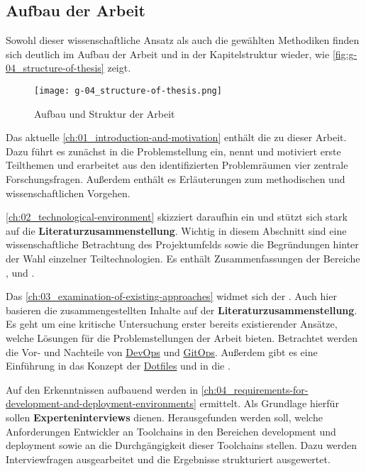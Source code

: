 \subsection{Aufbau der Arbeit}
\label{subsec:01-05-02_structure-of-the-thesis}

Sowohl dieser wissenschaftliche Ansatz als auch die gewählten Methodiken finden sich deutlich im Aufbau der Arbeit und in der Kapitelstruktur wieder, wie \autoref{fig:g-04_structure-of-thesis} zeigt.

\begin{figure}[h]
    \centering
    \texttt{[image: g-04\_structure-of-thesis.png]}
    \caption{Aufbau und Struktur der Arbeit}
    \label{fig:g-04_structure-of-thesis}
\end{figure}

Das aktuelle \autoref{ch:01_introduction-and-motivation} enthält die  zu dieser Arbeit. Dazu führt es zunächst in die Problemstellung ein, nennt und motiviert erste Teilthemen und erarbeitet aus den identifizierten Problemräumen vier zentrale Forschungsfragen. Außerdem enthält es Erläuterungen zum methodischen und wissenschaftlichen Vorgehen.

\pagebreak[4]

\autoref{ch:02_technological-environment} skizziert daraufhin ein  und stützt sich stark auf die \textbf{Literaturzusammenstellung}. Wichtig in diesem Abschnitt sind eine wissenschaftliche Betrachtung des Projektumfelds sowie die Begründungen hinter der Wahl einzelner Teiltechnologien. Es enthält Zusammenfassungen der Bereiche ,  und .

Das \autoref{ch:03_examination-of-existing-approaches} widmet sich der . Auch hier basieren die zusammengestellten Inhalte auf der \textbf{Literaturzusammenstellung}. Es geht um eine kritische Untersuchung erster bereits existierender Ansätze, welche Lösungen für die Problemstellungen der Arbeit bieten. Betrachtet werden die Vor- und Nachteile von \hyperref[sec:03-01_introduction-to-devops]{DevOps} und \hyperref[sec:03-03_gitops-as-further-evolution]{GitOps}. Außerdem gibt es eine Einführung in das Konzept der \hyperref[sec:03-04_idea-of-dotfiles]{Dotfiles} und in die \hyperref[sec:03-05_basic-idea-of-twelve-factor-app]{}.

Auf den Erkenntnissen aufbauend werden  in \autoref{ch:04_requirements-for-development-and-deployment-environments} ermittelt. Als Grundlage hierfür sollen \textbf{Experteninterviews} dienen. Herausgefunden werden soll, welche Anforderungen Entwickler an Toolchains in den Bereichen \Gls{development} und \Gls{deployment} sowie an die Durchgängigkeit dieser Toolchains stellen. Dazu werden Interviewfragen ausgearbeitet und die Ergebnisse strukturiert ausgewertet.


